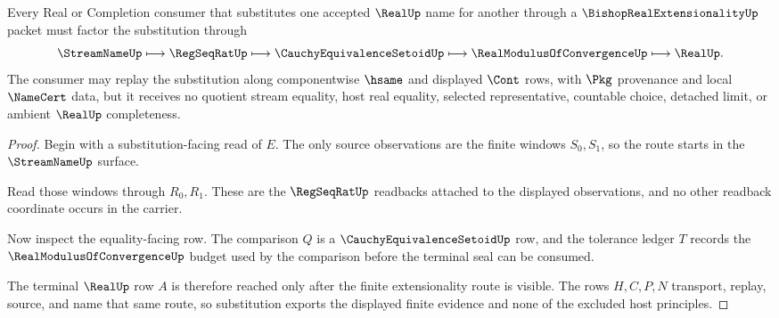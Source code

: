 \begin{theorem}
\label{thm:bishop-real-extensionality-substitution-route}
Every Real or Completion consumer that substitutes one accepted $\RealUp$ name for another through a $\BishopRealExtensionalityUp$ packet must factor the substitution through
$$
\StreamNameUp
\longmapsto
\RegSeqRatUp
\longmapsto
\CauchyEquivalenceSetoidUp
\longmapsto
\RealModulusOfConvergenceUp
\longmapsto
\RealUp .
$$
The consumer may replay the substitution along componentwise $\hsame$ and displayed $\Cont$ rows, with $\Pkg$ provenance and local $\NameCert$ data, but it receives no quotient stream equality, host real equality, selected representative, countable choice, detached limit, or ambient $\RealUp$ completeness.
\end{theorem}
\begin{proof}
Begin with a substitution-facing read of $E$. The only source observations are the finite windows $S_0,S_1$, so the route starts in the $\StreamNameUp$ surface.

Read those windows through $R_0,R_1$. These are the $\RegSeqRatUp$ readbacks attached to the displayed observations, and no other readback coordinate occurs in the carrier.

Now inspect the equality-facing row. The comparison $Q$ is a $\CauchyEquivalenceSetoidUp$ row, and the tolerance ledger $T$ records the $\RealModulusOfConvergenceUp$ budget used by the comparison before the terminal seal can be consumed.

The terminal $\RealUp$ row $A$ is therefore reached only after the finite extensionality route is visible. The rows $H,C,P,N$ transport, replay, source, and name that same route, so substitution exports the displayed finite evidence and none of the excluded host principles.
\end{proof}


